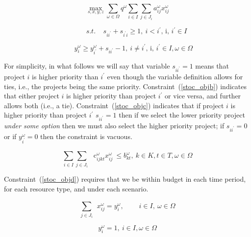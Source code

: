 \begin{equation}\label{stoc_obja}
\mathop{\max}_{s,x,y,z} \sum _{ \omega  \in  \Omega }^{}q^{ \omega } \sum _{i \in I}^{} \sum _{j \in J_{i}}^{}a_{ij}^{ \omega }x_{ij}^{ \omega }
\end{equation}

\begin{equation}\label{stoc_objb}
~~~~~~~~~~~~s.t.~~~~~s_{ii^{'}}+s_{i^{'}i} \geq 1,~ i<i^{'}\text{, i, }i^{'} \in I
\end{equation}

\begin{equation}\label{stoc_objc}
~~~~~~~~y_{i}^{ \omega } \geq y_{i^{'}}^{ \omega }+s_{ii^{'}}-1,~ i \neq i^{'}\text{, i, }i^{'} \in I,  \omega  \in  \Omega
\end{equation}

For simplicity, in what follows we will say that variable $s_{ii^{'}}=1$  means that project
$i$  is higher priority than $i^{'}$  even though the variable definition allows for ties,
i.e., the projects being the same priority. Constraint~(\ref{stoc_objb}) indicates that either
project  $i$  is higher priority than project  $i^{'}$  or vice versa, and further allows both
(i.e., a tie). Constraint~(\ref{stoc_objc}) indicates that if project  $i$  is higher priority
than project  $i^{'}$  $s_{ii^{'}}=1$  then if we select the lower priority project
\textit{under some option} then we must also select the higher priority project; if  $s_{ii^{'}}=0$
or if  $y_{i^{'}}^{\omega}=0$  then the constraint is vacuous.\par

\begin{equation}\label{stoc_objd}
 \sum _{i \in I}^{} \sum _{j \in J_{i}}^{}\text{~ c}_{ijkt}^{ \omega }x_{ij}^{ \omega }~  \leq  b_{kt}^{ \omega },~ k \in K, t \in T,  \omega  \in  \Omega
\end{equation}

Constraint~(\ref{stoc_objd}) requires that we be within budget in each time period, for each resource type, and under each scenario.

\begin{equation}\label{stoc_obje}
 \sum _{j \in J_{i}}^{}~~x_{ij}^{ \omega }= y_{i}^{ \omega },~~~~~~~~~~i \in I,~ \omega  \in  \Omega
\end{equation}

\begin{equation}\label{stoc_objf}
y_{i}^{ \omega }=1,~ i \in I,  \omega  \in  \Omega
\end{equation}

